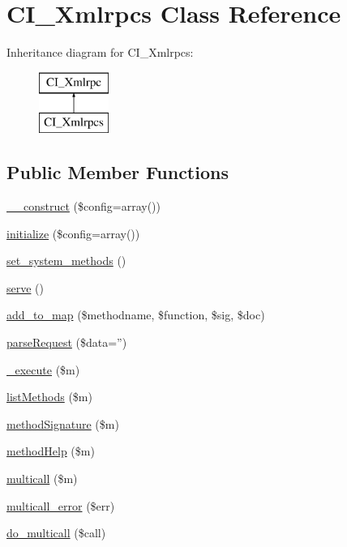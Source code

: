 \hypertarget{class_c_i___xmlrpcs}{\section{C\-I\-\_\-\-Xmlrpcs Class Reference}
\label{class_c_i___xmlrpcs}
}
Inheritance diagram for C\-I\-\_\-\-Xmlrpcs\-:\begin{figure}[H]
\begin{center}
\leavevmode
\includegraphics[height=2.000000cm]{class_c_i___xmlrpcs}
\end{center}
\end{figure}
\subsection*{Public Member Functions}
\begin{DoxyCompactItemize}
\item 
\hyperlink{class_c_i___xmlrpcs_af7f9493844d2d66e924e3c1df51ce616}{\-\_\-\-\_\-construct} (\$config=array())
\item 
\hyperlink{class_c_i___xmlrpcs_a481385e36d920f5a5005ace05c6cd016}{initialize} (\$config=array())
\item 
\hyperlink{class_c_i___xmlrpcs_a858a05529612358b8f63c88b08b414d0}{set\-\_\-system\-\_\-methods} ()
\item 
\hyperlink{class_c_i___xmlrpcs_aa9e0b443b9575f62bf9f8e85b1742c96}{serve} ()
\item 
\hyperlink{class_c_i___xmlrpcs_a73b29191620c55a5e2d3fda3a5c3cf44}{add\-\_\-to\-\_\-map} (\$methodname, \$function, \$sig, \$doc)
\item 
\hyperlink{class_c_i___xmlrpcs_a8a0c34554b9238be766ab85f55519b6e}{parse\-Request} (\$data='')
\item 
\hyperlink{class_c_i___xmlrpcs_a2f039adb8ec59c693300993c95138b46}{\-\_\-execute} (\$m)
\item 
\hyperlink{class_c_i___xmlrpcs_ad640f0b44d1956a05cfe40bab4e4043d}{list\-Methods} (\$m)
\item 
\hyperlink{class_c_i___xmlrpcs_a9f96cc0bd3338094174eb22cd90d6f2a}{method\-Signature} (\$m)
\item 
\hyperlink{class_c_i___xmlrpcs_a97626f30e860f4a63463f8674827dc00}{method\-Help} (\$m)
\item 
\hyperlink{class_c_i___xmlrpcs_a122ce829a1aa3f0041f922ec5feb95c8}{multicall} (\$m)
\item 
\hyperlink{class_c_i___xmlrpcs_a4cf545e6c15e1487b223346b18ca017d}{multicall\-\_\-error} (\$err)
\item 
\hyperlink{class_c_i___xmlrpcs_ab76189ac2d65f1e3ab6d65128e3748d5}{do\-\_\-multicall} (\$call)
\end{DoxyCompactItemize}
